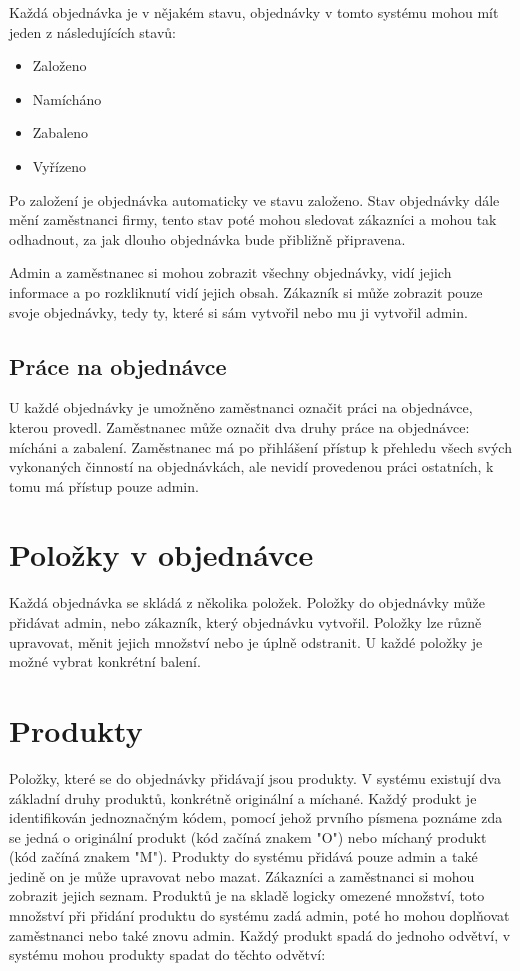 Každá objednávka je v nějakém stavu, objednávky v tomto systému mohou mít jeden z následujících stavů:

\begin{itemize}
  \item{Založeno}
  \item{Namícháno}
  \item{Zabaleno}
  \item{Vyřízeno}
\end{itemize}

Po založení je objednávka automaticky ve stavu založeno. Stav objednávky dále mění zaměstnanci firmy, tento stav poté mohou sledovat zákazníci a  mohou tak odhadnout, za jak dlouho objednávka bude přibližně připravena.

Admin a zaměstnanec si mohou zobrazit všechny objednávky, vidí jejich informace a po rozkliknutí vidí jejich obsah. Zákazník si může zobrazit pouze svoje objednávky, tedy ty, které si sám vytvořil nebo mu ji vytvořil admin.


\subsection{Práce na objednávce}

U každé objednávky je umožněno zaměstnanci označit práci na objednávce, kterou provedl. Zaměstnanec může označit dva druhy práce na objednávce: mícháni a zabalení. Zaměstnanec má po přihlášení přístup k přehledu všech svých vykonaných činností na objednávkách, ale nevidí provedenou práci ostatních, k tomu má přístup pouze admin. 


\section{Položky v objednávce}

Každá objednávka se skládá z několika položek. Položky do objednávky může přidávat admin, nebo zákazník, který objednávku vytvořil. Položky lze různě upravovat, měnit jejich množství nebo je úplně odstranit. U každé položky je možné vybrat konkrétní balení.


\section{Produkty}

Položky, které se do objednávky přidávají jsou produkty. V systému existují dva základní druhy produktů, konkrétně originální a míchané. Každý produkt je identifikován jednoznačným kódem, pomocí jehož prvního písmena poznáme zda se jedná o originální produkt (kód začíná znakem "O") nebo míchaný produkt (kód začíná znakem "M"). Produkty do systému přidává pouze admin a také jedině on je může upravovat nebo mazat. Zákazníci a zaměstnanci si mohou zobrazit jejich seznam. Produktů je na skladě logicky omezené množství, toto množství při přidání produktu do systému zadá admin, poté ho mohou doplňovat zaměstnanci nebo také znovu admin. Každý produkt spadá do jednoho odvětví, v systému mohou produkty spadat do těchto odvětví:

